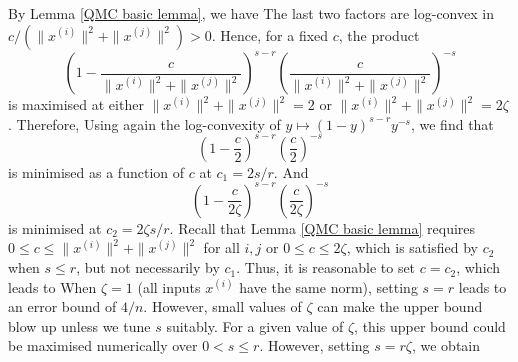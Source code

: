 By Lemma \ref{QMC basic lemma}, we have
The last two factors are log-convex in $c/( \| x^{(i)} \| ^2+ \| x^{(j)} \| ^2)>0$. Hence, for a fixed $c$, the product
$$\left(1-\frac{c}{ \| x^{(i)} \| ^2+ \| x^{(j)} \| ^2}\right)^{s-r} \left(\frac{c}{ \| x^{(i)} \| ^2+ \| x^{(j)} \| ^2}\right)^{-s} $$
 is maximised at either $ \| x^{(i)} \| ^2+ \| x^{(j)} \| ^2=2$ or $ \| x^{(i)} \| ^2+ \| x^{(j)} \| ^2=2\zeta$. Therefore,
Using again the log-convexity of $y\mapsto (1-y)^{s-r} y^{-s}$, we find that 
$$\left(1-\frac{c}{2}\right)^{s-r} \left(\frac{c}{2}\right)^{-s} $$
is minimised as a function of $c$ at $c_1 = 2s/r$. And
$$\left(1-\frac{c}{2\zeta}\right)^{s-r} \left(\frac{c}{2\zeta}\right)^{-s}$$
is minimised at $c_2 = 2\zeta s/r$. Recall that Lemma \ref{QMC basic lemma} requires $0\le c\leq  \| x^{(i)} \| ^2+ \| x^{(j)} \| ^2$ for all $i,j$ or $0\le c\leq 2\zeta$, which is satisfied by $c_2$ when $s\le r$, but not necessarily by $c_1$. Thus, it is reasonable to set $c=c_2$, which leads to
When $\zeta=1$ (all inputs $x^{(i)}$ have the same norm), setting $s=r$ leads to an  error bound of $4/n$. However, small values of $\zeta$ can make the upper bound blow up unless we tune $s$ suitably. For a given value of $\zeta$, this upper bound could be maximised numerically over $0<s\le r$. However, setting $s = r\zeta$, we obtain
